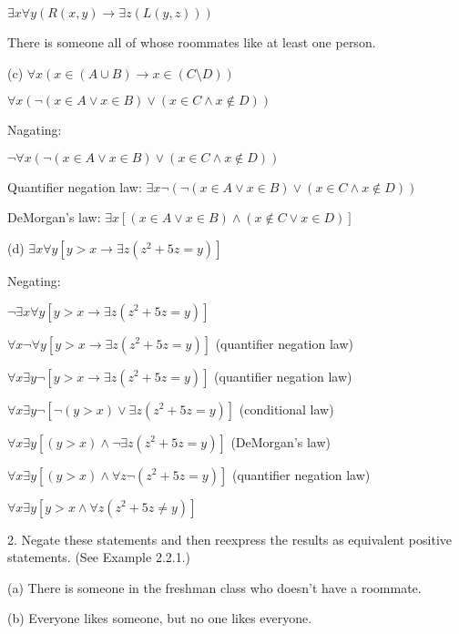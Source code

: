 \documentclass{article}
\begin{document}
$\exists x \forall y (R(x, y) \to \exists z (L(y, z)))$

There is someone all of whose roommates like at least one person.

\vspace{20pt}

(c) $\forall x (x \in (A \cup B) \to x \in (C \setminus D))$

$\forall x (\neg (x \in A \lor x \in B) \lor (x \in C \land x \notin D))$

Nagating:

$\neg \forall x (\neg (x \in A \lor x \in B) \lor (x \in C \land x \notin D))$

Quantifier negation law: $\exists x \neg (\neg (x \in A \lor x \in B) \lor (x \in C \land x \notin D))$

DeMorgan's law: $\exists x [(x \in A \lor x \in B) \land (x \notin C \lor x \in D)]$

\vspace{20pt}

(d) $\exists x \forall y [y > x \to \exists z (z^2 + 5z = y)]$

Negating:

$\neg \exists x \forall y [y > x \to \exists z (z^2 + 5z = y)]$

$\forall x \neg \forall y [y > x \to \exists z (z^2 + 5z = y)]$ (quantifier negation law)

$\forall x \exists y \neg [y > x \to \exists z (z^2 + 5z = y)]$ (quantifier negation law)

$\forall x \exists y \neg [\neg (y > x) \lor \exists z (z^2 + 5z = y)]$ (conditional law)

$\forall x \exists y [(y > x) \land \neg \exists z (z^2 + 5z = y)]$ (DeMorgan's law)

$\forall x \exists y [(y > x) \land \forall z \neg (z^2 + 5z = y)]$ (quantifier negation law)

$\forall x \exists y [y > x \land \forall z (z^2 + 5z \neq y)]$

\vspace{30pt}

2. Negate these statements and then reexpress the results as equivalent positive statements. (See Example 2.2.1.)

\hspace{12pt}(a) There is someone in the freshman class who doesn't have a roommate.

\hspace{12pt}(b) Everyone likes someone, but no one likes everyone.
\end{document}
